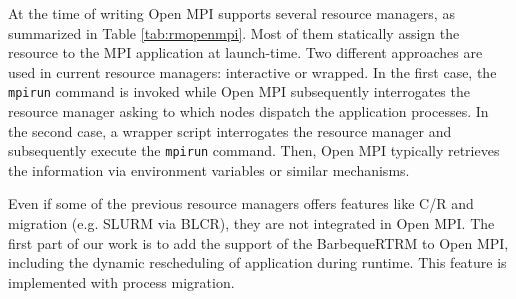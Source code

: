 At the time of writing Open MPI supports several resource managers, as
summarized in Table \ref{tab:rmopenmpi}. Most of them statically assign the
resource
to the MPI application at launch-time. Two different approaches are used in
current resource managers: interactive or wrapped. In the first case, the
\texttt{mpirun} command is invoked while Open MPI subsequently 
interrogates the resource manager asking to which nodes dispatch the application processes. 
In the second case, a wrapper script
interrogates the resource manager and subsequently execute the
\texttt{mpirun} command. Then, Open MPI typically retrieves the information
via environment variables or similar mechanisms.

Even if some of the previous resource managers offers features like C/R
and migration (e.g. SLURM via BLCR), they are not integrated in Open MPI.
The first part of our work is to add the support of the BarbequeRTRM to
Open MPI, including the dynamic rescheduling of application during runtime.
This feature is implemented with process migration.
